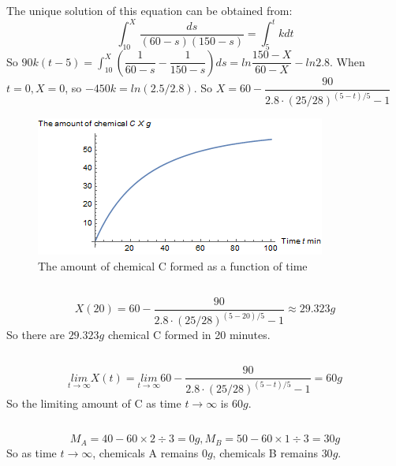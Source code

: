 \documentclass[a4paper,12pt,titlepage]{article}
\begin{document}
The unique solution of this equation can be obtained from:
$$\int_{10}^X\dfrac{ds}{(60-s)(150-s)}=\int_5^tkdt$$
So $90k(t-5)=\int_{10}^X(\dfrac{1}{60-s}-\dfrac{1}{150-s})ds=ln\dfrac{150-X}{60-X}-ln2.8$. When $t=0, X=0$, so $-450k=ln(2.5/2.8)$. So $X=60-\dfrac{90}{2.8\cdot(25/28)^{(5-t)/5}-1}$
\begin{figure}[ht]
	\centering
	\includegraphics[scale=1]{2.png}
	\caption{The amount of chemical C formed as a function of time}  
\end{figure}

\subsection{}
$$X(20)=60-\dfrac{90}{2.8\cdot(25/28)^{(5-20)/5}-1}\approx29.323g$$
So there are $29.323g$ chemical C formed in 20 minutes.

\subsection{}
$$\underset{t\rightarrow \infty}{lim}X(t)=\underset{t\rightarrow \infty}{lim}60-\dfrac{90}{2.8\cdot(25/28)^{(5-t)/5}-1}=60g$$
So the limiting amount of C as time $t\rightarrow \infty$ is $60g$.

\subsection{}
$$M_A=40-60\times2\div3=0g, M_B=50-60\times1\div3=30g$$
So as time $t\rightarrow \infty$, chemicals A remains $0g$, chemicals B remains $30g$. 
\end{document}
